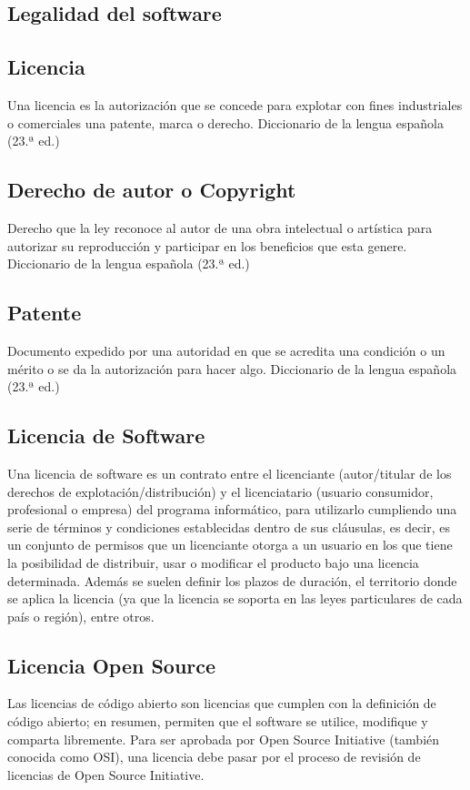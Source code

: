 \begin{spacing}{1.5}
\section{Legalidad del software}
	\subsection{Licencia}
	Una licencia es la autorización que se concede para explotar con fines industriales o comerciales una patente, marca o derecho. Diccionario de la lengua española (23.ª ed.)
	
	\subsection{Derecho de autor o Copyright}
	Derecho que la ley reconoce al autor de una obra intelectual o artística para autorizar su reproducción y participar en los beneficios que esta genere. Diccionario de la lengua española (23.ª ed.)
	
	\subsection{Patente}
	Documento expedido por una autoridad en que se acredita una condición o un mérito o se da la autorización para hacer algo. Diccionario de la lengua española (23.ª ed.)
	
	\subsection{Licencia de Software}
	Una licencia de software es un contrato entre el licenciante (autor/titular de los derechos de explotación/distribución) y el licenciatario (usuario consumidor, profesional o empresa) del programa informático, para utilizarlo cumpliendo una serie de términos y condiciones establecidas dentro de sus cláusulas, es decir, es un conjunto de permisos que un licenciante otorga a un usuario en los que tiene la posibilidad de distribuir, usar o modificar el producto bajo una licencia determinada. Además se suelen definir los plazos de duración, el territorio donde se aplica la licencia (ya que la licencia se soporta en las leyes particulares de cada país o región), entre otros.
	
	\subsection{Licencia Open Source}
	Las licencias de código abierto son licencias que cumplen con la definición de código abierto; en resumen, permiten que el software se utilice, modifique y comparta libremente. Para ser aprobada por Open Source Initiative (también conocida como OSI), una licencia debe pasar por el proceso de revisión de licencias de Open Source Initiative.\cite{chap2_open_source_2}\\
	

\end{spacing}
